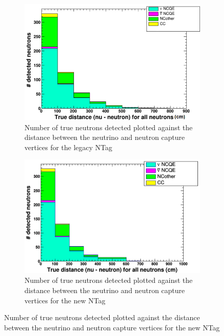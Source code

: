 \begin{figure}
    \centering
     \begin{subfigure}[b]{0.45\linewidth}
      \includegraphics[width=\linewidth]{Figures/TruCapNuNDistanceReductionLegacy.png}
      \caption{Number of true neutrons detected plotted against the distance between the neutrino and neutron capture vertices for the legacy NTag}
      \label{fig:TruCapNuNDistanceReductionLegacy} 
     \end{subfigure}
     \begin{subfigure}[b]{0.45\linewidth}
       \includegraphics[width=\linewidth]{Figures/TruCapNuNDistanceReductionNew.png}
        \caption{Number of true neutrons detected plotted against the distance between the neutrino and neutron capture vertices for the new NTag } 
     \label{fig:TruCapNuNDistanceReductionNew}
      \end{subfigure} 
\end{figure}

